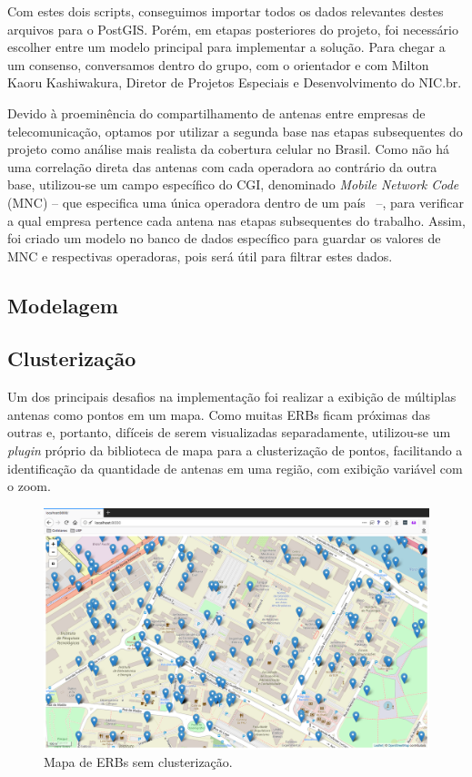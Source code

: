 \documentclass[]{politex}
\begin{document}
Com estes dois scripts, conseguimos importar todos os dados relevantes destes
arquivos para o PostGIS. Porém, em etapas posteriores do projeto, foi necessário
escolher entre um modelo principal para implementar a solução. Para chegar a um
consenso, conversamos dentro do grupo, com o orientador e com Milton Kaoru
Kashiwakura, Diretor de Projetos Especiais e Desenvolvimento do NIC.br.

Devido à proeminência do compartilhamento de antenas entre empresas de
telecomunicação, optamos por utilizar a segunda base nas etapas subsequentes do
projeto como análise mais realista da cobertura celular no Brasil. Como não há
uma correlação direta das antenas com cada operadora ao contrário da outra
base, utilizou-se um campo específico do CGI, denominado \textit{Mobile Network
Code} (MNC) -- que especifica uma única operadora dentro de um país~\cite{mcc-mnc}
--, para verificar a qual empresa pertence cada antena nas etapas subsequentes
do trabalho. Assim, foi criado um modelo no banco de dados específico para
guardar os valores de MNC e respectivas operadoras, pois será útil para filtrar
estes dados.

\subsection{Modelagem}


\subsection{Clusterização}

Um dos principais desafios na implementação foi realizar a exibição de múltiplas
antenas como pontos em um mapa. Como muitas ERBs ficam próximas das outras e,
portanto, difíceis de serem visualizadas separadamente, utilizou-se um
\textit{plugin} próprio da biblioteca de mapa para a clusterização de pontos,
facilitando a identificação da quantidade de antenas em uma região, com exibição
variável com o zoom.

\begin{figure}[H]
    \centering
    \includegraphics[width=6in]{imagens/mapa_sem_clusters}
    \caption{Mapa de ERBs sem clusterização.}
    \label{fig:mapa_sem_clusters}
\end{figure}
\end{document}
